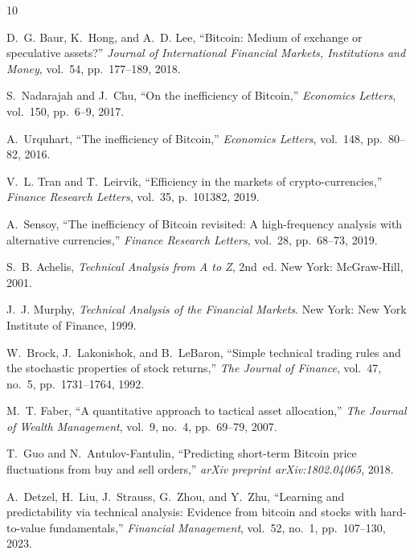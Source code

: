\documentclass[conference]{IEEEtran}
\begin{document}
\begin{thebibliography}{10}

D.~G. Baur, K.~Hong, and A.~D. Lee,
``Bitcoin: Medium of exchange or speculative assets?''
\emph{Journal of International Financial Markets,
Institutions and Money}, vol.~54, pp.~177--189, 2018.

S.~Nadarajah and J.~Chu,
``On the inefficiency of Bitcoin,''
\emph{Economics Letters}, vol.~150, pp.~6--9, 2017.

A.~Urquhart,
``The inefficiency of Bitcoin,''
\emph{Economics Letters}, vol.~148, pp.~80--82, 2016.

V.~L. Tran and T.~Leirvik,
``Efficiency in the markets of crypto-currencies,''
\emph{Finance Research Letters}, vol.~35, p.~101382, 2019.

A.~Sensoy,
``The inefficiency of Bitcoin revisited: A high-frequency
analysis with alternative currencies,''
\emph{Finance Research Letters}, vol.~28, pp.~68--73, 2019.

S.~B. Achelis,
\emph{Technical Analysis from A to Z}, 2nd~ed.
New York: McGraw-Hill, 2001.

J.~J. Murphy,
\emph{Technical Analysis of the Financial Markets}.
New York: New York Institute of Finance, 1999.

W.~Brock, J.~Lakonishok, and B.~LeBaron,
``Simple technical trading rules and the stochastic
properties of stock returns,''
\emph{The Journal of Finance}, vol.~47, no.~5,
pp.~1731--1764, 1992.

M.~T. Faber,
``A quantitative approach to tactical asset allocation,''
\emph{The Journal of Wealth Management}, vol.~9, no.~4,
pp.~69--79, 2007.

T.~Guo and N.~Antulov-Fantulin,
``Predicting short-term Bitcoin price fluctuations
from buy and sell orders,''
\emph{arXiv preprint arXiv:1802.04065}, 2018.

A.~Detzel, H.~Liu, J.~Strauss, G.~Zhou, and Y.~Zhu,
``Learning and predictability via technical analysis:
Evidence from bitcoin and stocks with hard-to-value
fundamentals,''
\emph{Financial Management}, vol.~52, no.~1,
pp.~107--130, 2023.


\end{thebibliography}
\end{document}
